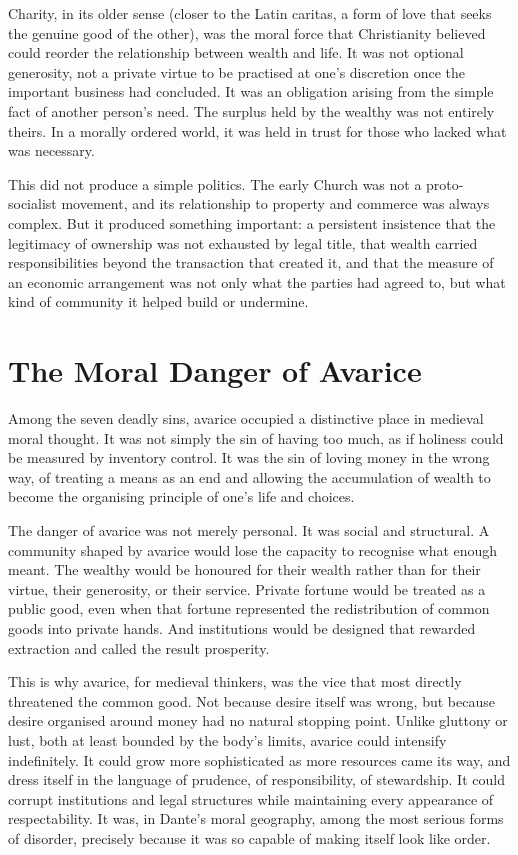 \documentclass[11pt,a4paper,oneside]{book}
\begin{document}
Charity, in its older sense (closer to the Latin caritas, a form of love that seeks the genuine good of the other), was the moral force that Christianity believed could reorder the relationship between wealth and life. It was not optional generosity, not a private virtue to be practised at one's discretion once the important business had concluded. It was an obligation arising from the simple fact of another person's need. The surplus held by the wealthy was not entirely theirs. In a morally ordered world, it was held in trust for those who lacked what was necessary.

This did not produce a simple politics. The early Church was not a proto-socialist movement, and its relationship to property and commerce was always complex. But it produced something important: a persistent insistence that the legitimacy of ownership was not exhausted by legal title, that wealth carried responsibilities beyond the transaction that created it, and that the measure of an economic arrangement was not only what the parties had agreed to, but what kind of community it helped build or undermine.

\section*{The Moral Danger of Avarice}

Among the seven deadly sins, avarice occupied a distinctive place in medieval moral thought. It was not simply the sin of having too much, as if holiness could be measured by inventory control. It was the sin of loving money in the wrong way, of treating a means as an end and allowing the accumulation of wealth to become the organising principle of one's life and choices.

The danger of avarice was not merely personal. It was social and structural. A community shaped by avarice would lose the capacity to recognise what enough meant. The wealthy would be honoured for their wealth rather than for their virtue, their generosity, or their service. Private fortune would be treated as a public good, even when that fortune represented the redistribution of common goods into private hands. And institutions would be designed that rewarded extraction and called the result prosperity.

This is why avarice, for medieval thinkers, was the vice that most directly threatened the common good. Not because desire itself was wrong, but because desire organised around money had no natural stopping point. Unlike gluttony or lust, both at least bounded by the body's limits, avarice could intensify indefinitely. It could grow more sophisticated as more resources came its way, and dress itself in the language of prudence, of responsibility, of stewardship. It could corrupt institutions and legal structures while maintaining every appearance of respectability. It was, in Dante's moral geography, among the most serious forms of disorder, precisely because it was so capable of making itself look like order.
\end{document}
